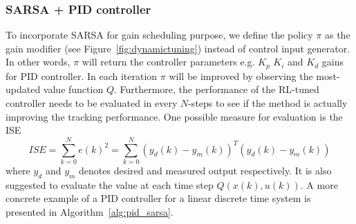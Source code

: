 	\subsubsection{\ac{SARSA} + \ac{PID} controller}
	To incorporate \ac{SARSA} for gain scheduling purpose, we define the policy $\pi$ as the gain modifier (see Figure~\ref{fig:dynamictuning}) instead of control input generator. In other words, $\pi$ will return the controller parameters e.g. $ K_p $ $ K_i $ and $ K_d $ gains for \ac{PID} controller. In each iteration $\pi$ will be improved by observing the most-updated value function $Q$. Furthermore, the performance of the \ac {RL}-tuned controller needs to be evaluated in every $ N $-steps to see if the method is actually improving the tracking performance. One possible measure for evaluation is the \ac {ISE}
	\begin{equation}
	ISE = \sum_{k=0}^{N}e(k)^2 = \sum_{k=0}^{N}(y_d(k) - y_m(k))^T(y_d(k) - y_m(k))
	\end{equation}
	where $y_d$ and $y_m$ denotes desired and measured output respectively. It is also suggested to evaluate the value at each time step $Q(x(k), u(k))$. A more concrete example of a \ac{PID} controller for a linear discrete time system is presented in Algorithm~\ref{alg:pid_sarsa}.
	
